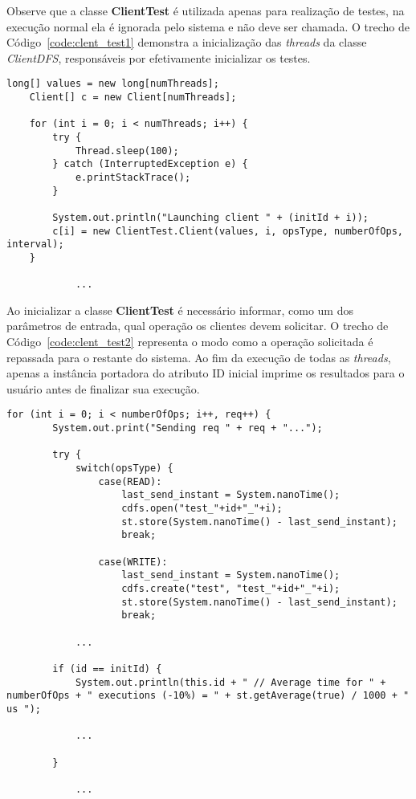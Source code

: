 Observe que a classe \textbf{ClientTest} é utilizada apenas para realização de testes, na execução normal ela é ignorada pelo sistema e não deve ser chamada. O trecho de Código~\ref{code:clent_test1} demonstra a inicialização das \textit{threads} da classe \textit{ClientDFS}, responsáveis por efetivamente inicializar os testes.
\\

\begin{lstlisting}[basicstyle=\ttfamily\footnotesize, frame=single, caption=Preparação de teste na classe ClientTest, label=code:clent_test1]		
	long[] values = new long[numThreads];
	Client[] c = new Client[numThreads];
	
	for (int i = 0; i < numThreads; i++) {
		try {
			Thread.sleep(100);
		} catch (InterruptedException e) {
			e.printStackTrace();
		}
	
		System.out.println("Launching client " + (initId + i));
		c[i] = new ClientTest.Client(values, i, opsType, numberOfOps, interval);
	}
		
			...
\end{lstlisting}

Ao inicializar a classe \textbf{ClientTest} é necessário informar, como um dos parâmetros de entrada, qual operação os clientes devem solicitar. O trecho de Código~\ref{code:clent_test2} representa o modo como a operação solicitada é repassada para o restante do sistema. Ao fim da execução de todas as \textit{threads}, apenas a instância portadora do atributo ID inicial imprime os resultados para o usuário antes de finalizar sua execução.
\\

\begin{lstlisting}[basicstyle=\ttfamily\footnotesize, frame=single, caption=Execução de teste na classe ClientTest, label=code:clent_test2]
	for (int i = 0; i < numberOfOps; i++, req++) {
		System.out.print("Sending req " + req + "...");
		
		try {
			switch(opsType) {
				case(READ):
					last_send_instant = System.nanoTime();
					cdfs.open("test_"+id+"_"+i);
					st.store(System.nanoTime() - last_send_instant);
					break;
				
				case(WRITE):
					last_send_instant = System.nanoTime();
					cdfs.create("test", "test_"+id+"_"+i);
					st.store(System.nanoTime() - last_send_instant);
					break;
				
			...
				
		if (id == initId) {
			System.out.println(this.id + " // Average time for " + numberOfOps + " executions (-10%) = " + st.getAverage(true) / 1000 + " us ");
			
			...
				
		}	
			
			...
\end{lstlisting}
 
